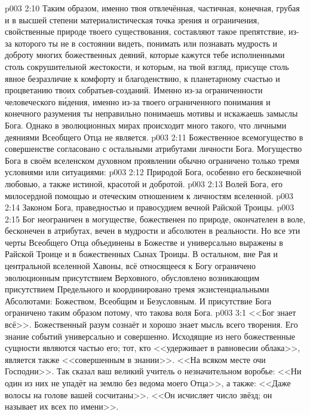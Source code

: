 \vs p003 2:10 Таким образом, именно твоя отвлечённая, частичная, конечная, грубая и в высшей степени материалистическая точка зрения и ограничения, свойственные природе твоего существования, составляют такое препятствие, из\hyp{}за которого ты не в состоянии видеть, понимать или познавать мудрость и доброту многих божественных деяний, которые кажутся тебе исполненными столь сокрушительной жестокости, и которым, на твой взгляд, присуще столь явное безразличие к комфорту и благоденствию, к планетарному счастью и процветанию твоих собратьев\hyp{}созданий. Именно из\hyp{}за ограниченности человеческого в\'идения, именно из\hyp{}за твоего ограниченного понимания и конечного разумения ты неправильно понимаешь мотивы и искажаешь замыслы Бога. Однако в эволюционных мирах происходит много такого, что личными деяниями Всеобщего Отца не является.
\vs p003 2:11 \pc Божественное всемогущество в совершенстве согласовано с остальными атрибутами личности Бога. Могущество Бога в своём вселенском духовном проявлении обычно ограничено только тремя условиями или ситуациями:
\vs p003 2:12 \bibnobreakspace Природой Бога, особенно его бесконечной любовью, а также истиной, красотой и добротой.
\vs p003 2:13 \bibnobreakspace Волей Бога, его милосердной помощью и отеческим отношением к личностям вселенной.
\vs p003 2:14 \bibnobreakspace Законом Бога, праведностью и правосудием вечной Райской Троицы.
\vs p003 2:15 \pc Бог неограничен в могуществе, божественен по природе, окончателен в воле, бесконечен в атрибутах, вечен в мудрости и абсолютен в реальности. Но все эти черты Всеобщего Отца объединены в Божестве и универсально выражены в Райской Троице и в божественных Сынах Троицы. В остальном, вне Рая и центральной вселенной Хавоны, всё относящееся к Богу ограничено эволюционным присутствием Верховного, обусловлено возникающим присутствием Предельного и координировано тремя экзистенциальными Абсолютами: Божеством, Всеобщим и Безусловным. И присутствие Бога ограничено таким образом потому, что такова воля Бога.
\vs p003 3:1 <<Бог знает всё>>. Божественный разум сознаёт и хорошо знает мысль всего творения. Его знание событий универсально и совершенно. Исходящие из него божественные сущности являются частью его; тот, кто <<удерживает в равновесии облака>>, является также <<совершенным в знании>>. <<На всяком месте очи Господни>>. Так сказал ваш великий учитель о незначительном воробье: <<Ни один из них не упадёт на землю без ведома моего Отца>>, а также: <<Даже волосы на голове вашей сосчитаны>>. <<Он исчисляет число звёзд; он называет их всех по имени>>.
